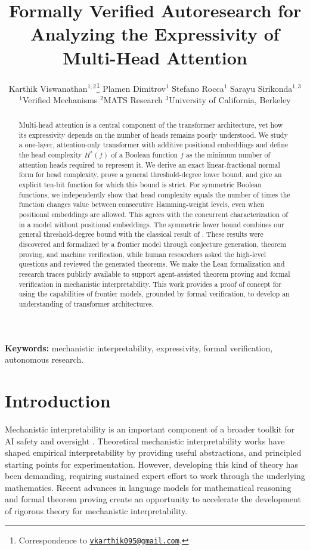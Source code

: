 \documentclass{article}
\title{Formally Verified Autoresearch for Analyzing the Expressivity of Multi-Head Attention}
\author{%
  Karthik Viswanathan$^{1,2}$\thanks{Correspondence to \href{mailto:vkarthik095@gmail.com}{\texttt{vkarthik095@gmail.com}}.} \quad
  Plamen Dimitrov$^{1}$ \quad
  Stefano Rocca$^{1}$ \quad
  Sarayu Sirikonda$^{1,3}$ \\
  $^{1}$Verified Mechanisms \quad $^{2}$MATS Research \quad
  $^{3}$University of California, Berkeley
}
\theoremstyle{definition}
\theoremstyle{plain}
\begin{document}
\maketitle

\begin{abstract}
Multi-head attention is a central component of the transformer architecture, yet how its expressivity depends on the number of heads remains poorly understood. We study a one-layer, attention-only transformer with additive positional embeddings and define the head complexity $H^\ast(f)$ of a Boolean function $f$ as the minimum number of attention heads required to represent it. We derive an exact linear-fractional normal form for head complexity, prove a general threshold-degree lower bound, and give an explicit ten-bit function for which this bound is strict. For symmetric Boolean functions, we independently show that head complexity equals the number of times the function changes value between consecutive Hamming-weight levels, even when positional embeddings are allowed. This agrees with the concurrent characterization of \citet{hsu2026attentionbased} in a model without positional embeddings. The symmetric lower bound combines our general threshold-degree bound with the classical result of \citet{aspnes1994expressive}. These results were discovered and formalized by a frontier model through conjecture generation, theorem proving, and machine verification, while human researchers asked the high-level questions and reviewed the generated theorems. We make the Lean formalization and research traces publicly available to support agent-assisted theorem proving and formal verification in mechanistic interpretability. This work provides a proof of concept for using the capabilities of frontier models, grounded by formal verification, to develop an understanding of transformer architectures.
\end{abstract}

\noindent\textbf{Keywords:} mechanistic interpretability, expressivity, formal verification, autonomous research.

\section{Introduction}
\label{sec:introduction}

Mechanistic interpretability is an important component of a broader toolkit for AI safety and oversight \cite{ISRSAA2026}. Theoretical mechanistic interpretability works \cite{elhage2021mathematical, elhage2022toymodelssuperposition, geshkovski2025mathematicalperspectivetransformers} have shaped empirical interpretability \cite{olsson2022incontextlearninginductionheads, cunningham2023sparseautoencodershighlyinterpretable, viswanathan2026the} by providing useful abstractions, and principled starting points for experimentation. However, developing this kind of theory has been demanding, requiring sustained expert effort to work through the underlying mathematics. Recent advances in language models for mathematical reasoning and formal theorem proving \cite{tsoukalas2026advancingmathematicsresearchaidriven, alon2026remarksdisproofunitdistance, yang2023leandojo} create an opportunity to accelerate the development of rigorous theory for mechanistic interpretability.
\end{document}
